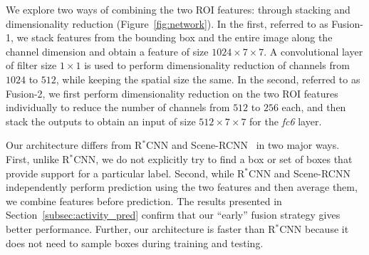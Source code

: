 \documentclass[runningheads]{llncs}
\begin{document}
We explore two ways of combining the two ROI features: through stacking and dimensionality reduction (Figure~\ref{fig:network}).
In the first, referred to as Fusion-1, we stack features from the bounding box and the entire image along the channel dimension and obtain a feature of size $1024\times 7\times 7$. A convolutional layer of filter size $1\times 1$ is used to perform dimensionality reduction of channels from $1024$ to $512$, while keeping the spatial size the same.
In the second, referred to as Fusion-2, we first perform dimensionality reduction on the two ROI features individually to reduce the number of channels from $512$ to $256$ each, and then stack the outputs to obtain an input of size $512\times 7\times 7$ for the \emph{fc6} layer.  

Our architecture differs from R$^*$CNN and Scene-RCNN~\cite{gkioxari2015rstarcnn} in two major ways. First, unlike R$^*$CNN, we do not explicitly try to find a box or set of boxes that provide support for a particular label. Second, while R$^*$CNN and Scene-RCNN independently perform prediction using the two features and then average them, we combine features before prediction. The results presented in Section~\ref{subsec:activity_pred} confirm that our ``early'' fusion strategy gives better performance. %
Further, our architecture is faster than R$^*$CNN because it does not need to sample boxes during training and testing.
\end{document}
